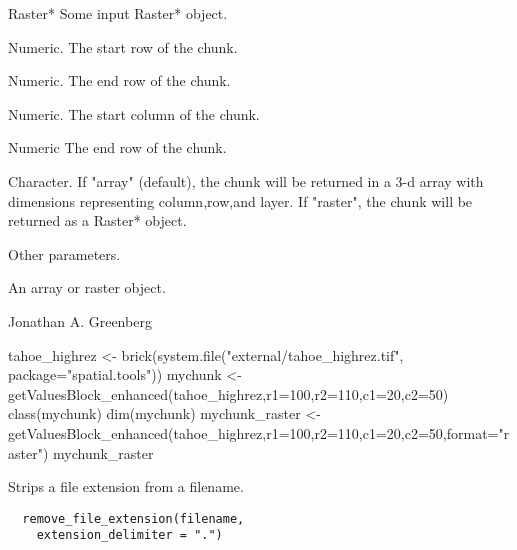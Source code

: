 \documentclass[a4paper]{book}
\begin{document}
%
\begin{Arguments}
\begin{ldescription}
\item[\code{x}] Raster* Some input Raster* object.

\item[\code{r1}] Numeric. The start row of the chunk.

\item[\code{r2}] Numeric. The end row of the chunk.

\item[\code{c1}] Numeric. The start column of the chunk.

\item[\code{c2}] Numeric The end row of the chunk.

\item[\code{format}] Character. If "array" (default), the chunk
will be returned in a 3-d array with dimensions
representing column,row,and layer.  If "raster", the
chunk will be returned as a Raster* object.

\item[\code{...}] Other parameters.
\end{ldescription}
\end{Arguments}
%
\begin{Value}
An array or raster object.
\end{Value}
%
\begin{Author}\relax
Jonathan A. Greenberg
\end{Author}
%
\begin{SeeAlso}\relax
{}
\end{SeeAlso}
%
\begin{Examples}
\begin{ExampleCode}
tahoe_highrez <- brick(system.file("external/tahoe_highrez.tif", package="spatial.tools"))
mychunk <- getValuesBlock_enhanced(tahoe_highrez,r1=100,r2=110,c1=20,c2=50)
class(mychunk)
dim(mychunk)
mychunk_raster <- getValuesBlock_enhanced(tahoe_highrez,r1=100,r2=110,c1=20,c2=50,format="raster")
mychunk_raster
\end{ExampleCode}
\end{Examples}
%
\begin{Description}\relax
Strips a file extension from a filename.
\end{Description}
%
\begin{Usage}
\begin{verbatim}
  remove_file_extension(filename,
    extension_delimiter = ".")
\end{verbatim}
\end{Usage}
\end{document}
